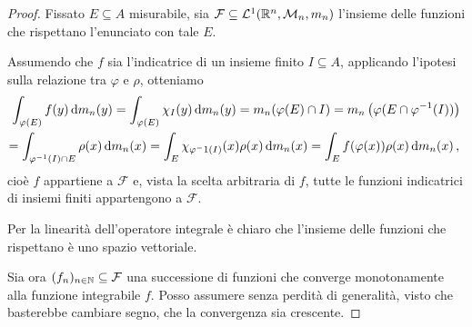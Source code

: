 \begin{proof}
	Fissato $E\subseteq A$ misurabile, sia $\mathcal F\subseteq \mathcal L^1(\mathbb R^n,\mathcal M_n,m_n)$ l'insieme delle funzioni che rispettano l'enunciato con tale $E$.
	
	Assumendo che $f$ sia l'indicatrice di un insieme finito $I\subseteq A$, applicando l'ipotesi sulla relazione tra $\varphi$ e $\rho$, otteniamo
	\begin{multline*}
		\int_{\varphi(E)} f(y)\,\mathrm d m_n(y)=\int_{\varphi(E)} \chi_I(y)\,\mathrm d m_n(y)=m_n(\varphi(E)\cap I)=m_n\left(\varphi(E\cap \varphi^{-1}(I))\right) \\
		=\int_{\varphi^{-1}(I)\cap E}\rho(x)\,\mathrm d m_n(x)=\int_E \chi_{\varphi^-1(I)}(x)\rho(x)\,\mathrm d m_n(x)=\int_E f(\varphi(x))\rho(x)\,\mathrm d m_n(x) \, \text{, }
	\end{multline*}
	cioè $f$ appartiene a $\mathcal F$ e, vista la scelta arbitraria di $f$, tutte le funzioni indicatrici di insiemi finiti appartengono a $\mathcal F$.
	
	Per la linearità dell'operatore integrale è chiaro che l'insieme delle funzioni che rispettano è uno spazio vettoriale.
	
	Sia ora $(f_n)_{n\in\mathbb N}\subseteq \mathcal F$ una successione di funzioni che converge monotonamente alla funzione integrabile $f$. Posso assumere senza perdità di generalità, visto che basterebbe cambiare segno, che la convergenza sia crescente.
	

\end{proof}

